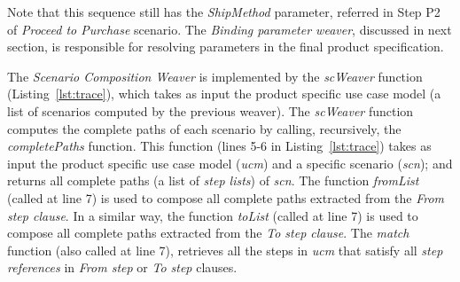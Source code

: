 \documentclass{acm_proc_article-sp}
\begin{document}
Note that this sequence still has  the \emph{ShipMethod} parameter,
referred in Step P2 of \emph{Proceed to Purchase} scenario. The \emph{Binding parameter weaver}, discussed in next section, is responsible for resolving parameters in the final
product specification.



The \emph{Scenario Composition Weaver} is implemented by the \emph{scWeaver} function (Listing~\ref{lst:trace}), which takes
as input the product specific use case model (a list of scenarios computed by the previous weaver).
The \emph{scWeaver} function computes the complete paths of each
scenario by calling, recursively, the \emph{completePaths} function. This
function (lines 5-6 in Listing~\ref{lst:trace})
takes as input the product specific use case model (\emph{ucm}) and a specific
scenario (\emph{scn});
and returns all complete paths (a list of \emph{step lists}) of
\emph{scn}. The function \emph{fromList} (called at line 7) is used to
compose all complete paths extracted from the \emph{From step
clause}. In a similar way, the function \emph{toList} (called at
line 7) is used to compose all complete paths extracted from the
\emph{To step clause}. The \emph{match} function (also called at
line 7), retrieves all the steps in \emph{ucm} that satisfy all
\emph{step references} in \emph{From step} or \emph{To step}
clauses.

\end{document}
